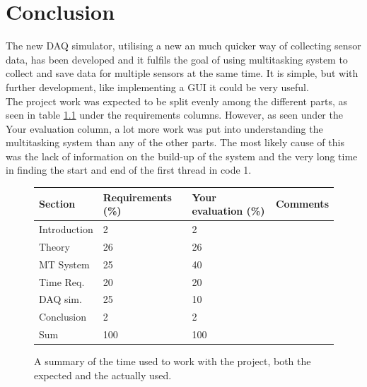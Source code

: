 \documentclass[12pt, A4paper, english]{book}
\begin{document}
	\chapter{Conclusion}
The new DAQ simulator, utilising a new an much quicker way of collecting sensor data, has been developed and it fulfils the goal of using multitasking system to collect and save data for multiple sensors at the same time. It is simple, but with further development, like implementing a GUI it could be very useful. \\
The project work was expected to be split evenly among the different parts, as seen in table \ref{tab:eval} under the requirements columns. However, as seen under the Your evaluation column, a lot more work was put into understanding the multitasking system than any of the other parts. The most likely cause of this was the lack of information on the build-up of the system and the very long time in finding the start and end of the first thread in code 1.
		\begin{figure}
\centering
\noindent \begin{tabularx}{\linewidth}{@{}|X|X|X|X|}
\hline
Section 		& Requirements (\%)	& Your evaluation (\%) 	& Comments \\
\hline
Introduction 	& 2					& 2						&  \\
\hline
Theory 			& 26				& 26 					&  \\
\hline
MT System		& 25				& 40 					&  \\
\hline
Time Req.		& 20				& 20					&  \\
\hline
DAQ sim. 		& 25				& 10					&  \\
\hline
Conclusion 		& 2					& 2						&  \\
\hline
Sum				& 100				& 100 					&  \\
\hline
			\end{tabularx}
\caption{A summary of the time used to work with the project, both the expected and the actually used.}
\label{tab:eval}
		\end{figure}

\printbibliography
	
\end{document}
